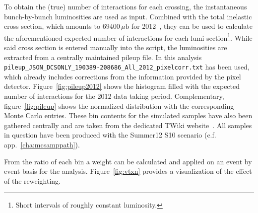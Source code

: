 To obtain the (true) number of interactions for each crossing, the instantaneous bunch-by-bunch luminosities are used as input. Combined with the total inelastic cross section, which amounts to $69400\,\mu\text{b}$ for 2012~\cite{pileup}, they can be used to calculate the aforementioned expected number of interactions for each lumi section\footnote{Short intervals of roughly constant luminosity.}. While said cross section is entered manually into the script, the luminosities are extracted from a centrally maintained pileup file. In this analysis \verb+pileup_JSON_DCSONLY_190389-208686_All_2012_pixelcorr.txt+ has been used, which already includes corrections from the information provided by the pixel detector. Figure~\ref{fig:pileup2012} shows the histogram filled with the expected number of interactions for the 2012 data taking period. Complementary, figure~\ref{fig:pileup} shows the normalized distribution with the corresponding Monte Carlo entries. These bin contents for the simulated samples have also been gathered centrally and are taken from the dedicated TWiki website~\cite{pileupmc}. All samples in question have been produced with the Summer12 S10 scenario (c.f. app.~\ref{cha:mcsamppath}).

From the ratio of each bin a weight can be calculated and applied on an event by event basis for the analysis. Figure~\ref{fig:vtxn} provides a visualization of the effect of the reweighting.

